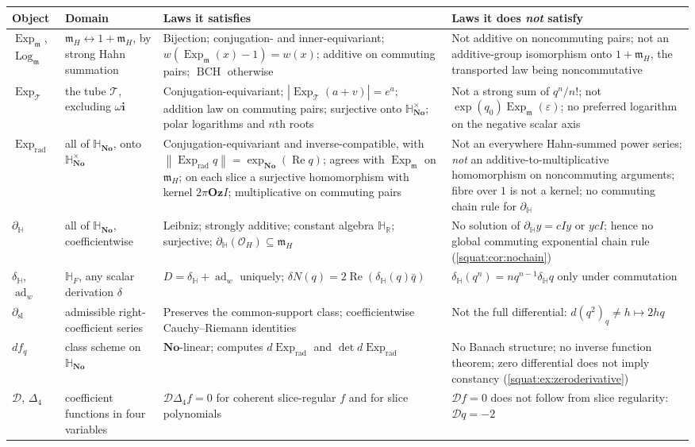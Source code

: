 \documentclass[11pt,letterpaper]{article}
\numberwithin{equation}{section}
\theoremstyle{definition}
\theoremstyle{remark}
\newcommand{\No}{\mathbf{No}}
\newcommand{\SQ}{\mathbb H_{\No}}
\newcommand{\HF}{\mathbb H_F}
\newcommand{\HR}{\mathbb H_{\mathbb R}}
\newcommand{\OO}{\mathcal O}
\newcommand{\mm}{\mathfrak m}
\newcommand{\Oz}{\mathbf{Oz}}
\newcommand{\eps}{\varepsilon}
\newcommand{\ii}{\mathbf i}
\newcommand{\Rea}{\operatorname{Re}}
\newcommand{\ad}{\operatorname{ad}}
\newcommand{\Exp}{\operatorname{Exp}}
\newcommand{\Log}{\operatorname{Log}}
\newcommand{\Expm}{\Exp_{\mm}}
\newcommand{\Logm}{\Log_{\mm}}
\newcommand{\Expt}{\Exp_{\mathcal T}}
\newcommand{\Expr}{\Exp_{\mathrm{rad}}}
\newcommand{\BCH}{\operatorname{BCH}}
\newcommand{\abs}[1]{\left|#1\right|}
\newcommand{\norm}[1]{\left\|#1\right\|}
\newcommand{\DD}{\mathcal D}
\newcommand{\dsl}{\partial_{\mathrm{sl}}}
\newcommand{\dH}{\partial_{\mathbb H}}
\newcommand{\delH}{\delta_{\mathbb H}}
\begin{document}
\begin{center}\small
\begin{tabular}{L{0.155\textwidth}L{0.215\textwidth}L{0.25\textwidth}L{0.26\textwidth}}
\toprule
Object & Domain & Laws it satisfies & Laws it does \emph{not} satisfy\\
\midrule
$\Expm$, $\Logm$ &
$\mm_H\leftrightarrow1+\mm_H$, by strong Hahn summation &
Bijection; conjugation- and inner-equivariant; $w(\Expm(x)-1)=w(x)$; additive on
commuting pairs; $\BCH$ otherwise &
Not additive on noncommuting pairs; not an additive-group isomorphism onto
$1+\mm_H$, the transported law
being noncommutative\\[3pt]
$\Expt$ &
the tube $\mathcal T$, excluding $\omega\ii$ &
Conjugation-equivariant; $\abs{\Expt(a+v)}=e^a$; addition law on commuting pairs;
surjective onto $\SQ^\times$; polar logarithms and $n$th roots &
Not a strong sum of $q^n/n!$; not $\exp(q_0)\Expm(\eps)$; no preferred logarithm on the
negative scalar axis\\[3pt]
$\Expr$ &
all of $\SQ$, onto $\SQ^\times$ &
Conjugation-equivariant and inverse-compatible, with
$\norm{\Expr q}=\exp_{\No}(\Rea q)$; agrees with $\Expm$ on $\mm_H$; on each slice a
surjective homomorphism with kernel $2\pi\Oz I$; multiplicative on commuting pairs &
Not an everywhere Hahn-summed power series; \emph{not} an
additive-to-multiplicative homomorphism on noncommuting arguments; fibre over $1$ is not
a kernel; no commuting chain rule for $\dH$\\[3pt]
$\dH$ &
all of $\SQ$, coefficientwise &
Leibniz; strongly additive; constant algebra $\HR$; surjective;
$\dH(\OO_H)\subseteq\mm_H$ &
No solution of $\dH y=cIy$ or $y cI$; hence no global commuting exponential chain rule
(\cref{squat:cor:nochain})\\[3pt]
$\delH$, $\ad_w$ &
$\HF$, any scalar derivation $\delta$ &
$D=\delH+\ad_w$ uniquely; $\delta N(q)=2\Rea(\delH(q)\bar q)$ &
$\delH(q^n)=nq^{n-1}\delH q$ only under commutation\\[3pt]
$\dsl$ &
admissible right-coefficient series &
Preserves the common-support class; coefficientwise Cauchy--Riemann identities &
Not the full differential: $d(q^2)_q\ne h\mapsto2hq$\\[3pt]
$df_q$ &
class scheme on $\SQ$ &
$\No$-linear; computes $d\Expr$ and $\det d\Expr$ &
No Banach structure; no inverse function theorem; zero differential does not imply
constancy (\cref{squat:ex:zeroderivative})\\[3pt]
$\DD$, $\Delta_4$ &
coefficient functions in four variables &
$\DD\Delta_4f=0$ for coherent slice-regular $f$ and for slice polynomials &
$\DD f=0$ does not follow from slice regularity: $\DD q=-2$\\
\bottomrule
\end{tabular}
\end{center}
\end{document}
